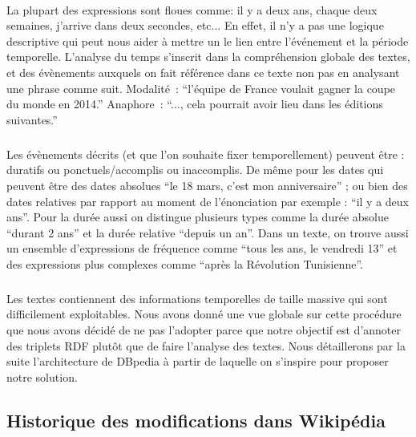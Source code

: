 \paragraph{}
La plupart des expressions sont floues comme: il y a deux ans, chaque deux semaines, j’arrive dans deux secondes, etc... En effet, il n'y a pas une logique descriptive qui peut nous aider à mettre un le lien entre l'événement et la période temporelle. L’analyse du temps s’inscrit dans la compréhension globale des textes, et des évènements auxquels on fait référence dans ce texte non pas en analysant une phrase comme suit. 
\newline
Modalité~: ``l’équipe de France voulait gagner la coupe du monde en 2014.'' 
\newline
Anaphore~:  ``..., cela pourrait avoir lieu dans les éditions suivantes.''
\subparagraph{}
Les évènements décrits (et que l’on souhaite fixer temporellement) peuvent être : duratifs ou ponctuels/accomplis ou inaccomplis. 
De même pour les dates qui peuvent être des dates absolues ``le 18 mars, c'est mon anniversaire'' ; ou bien des dates relatives par rapport au moment de l’énonciation par exemple : ``il y a deux ans''. Pour la durée aussi on distingue plusieurs types comme la durée absolue ``durant 2 ans'' et la durée relative ``depuis un an''. Dans un texte, on trouve aussi un ensemble d'expressions de fréquence comme ``tous les ans, le vendredi 13'' et des expressions plus complexes comme ``après la Révolution Tunisienne''.
\subparagraph{}
Les textes contiennent des informations temporelles de taille massive qui sont difficilement exploitables. Nous avons donné une vue globale sur cette procédure que nous avons décidé de ne pas l'adopter parce que notre objectif est d'annoter des triplets RDF plutôt que de faire l'analyse des textes. Nous détaillerons par la suite l'architecture de DBpedia à partir de laquelle on s'inspire pour proposer notre solution.
\subsection{Historique des modifications dans Wikipédia}
